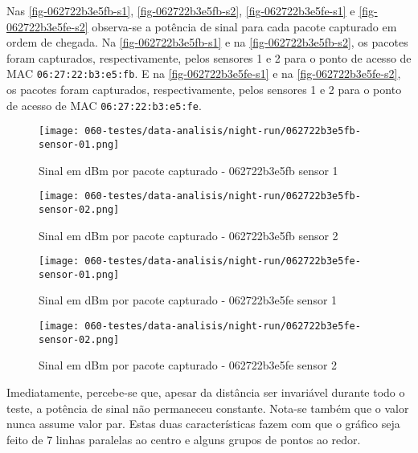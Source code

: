 Nas \autoref{fig-062722b3e5fb-s1}, \autoref{fig-062722b3e5fb-s2},
\autoref{fig-062722b3e5fe-s1} e \autoref{fig-062722b3e5fe-s2} observa-se a
potência de sinal para cada pacote capturado em ordem de chegada. Na
\autoref{fig-062722b3e5fb-s1} e na \autoref{fig-062722b3e5fb-s2}, os pacotes
foram capturados, respectivamente, pelos sensores 1 e 2 para o ponto de acesso
de MAC \texttt{06:27:22:b3:e5:fb}. E na \autoref{fig-062722b3e5fe-s1} e na
\autoref{fig-062722b3e5fe-s2}, os pacotes foram capturados, respectivamente,
pelos sensores 1 e 2 para o ponto de acesso de MAC \texttt{06:27:22:b3:e5:fe}.

\begin{figure}[htb]
	\centering
	\caption{\label{fig-062722b3e5fb-s1}Sinal em dBm por pacote capturado - 062722b3e5fb sensor 1}
	\texttt{[image: 060-testes/data-analisis/night-run/062722b3e5fb-sensor-01.png]}
\end{figure}

\begin{figure}[htb]
	\centering
	\caption{\label{fig-062722b3e5fb-s2}Sinal em dBm por pacote capturado - 062722b3e5fb sensor 2}
	\texttt{[image: 060-testes/data-analisis/night-run/062722b3e5fb-sensor-02.png]}
\end{figure}

\begin{figure}[htb]
	\centering
	\caption{\label{fig-062722b3e5fe-s1}Sinal em dBm por pacote capturado - 062722b3e5fe sensor 1}
	\texttt{[image: 060-testes/data-analisis/night-run/062722b3e5fe-sensor-01.png]}
\end{figure}

\begin{figure}[htb]
	\centering
	\caption{\label{fig-062722b3e5fe-s2}Sinal em dBm por pacote capturado - 062722b3e5fe sensor 2}
	\texttt{[image: 060-testes/data-analisis/night-run/062722b3e5fe-sensor-02.png]}
\end{figure}

\FloatBarrier

Imediatamente, percebe-se que, apesar da distância ser invariável durante todo o
teste, a potência de sinal não permaneceu constante. Nota-se também que o valor
nunca assume valor par. Estas duas características fazem com que o gráfico seja
feito de 7 linhas paralelas ao centro e alguns grupos de pontos ao redor.

